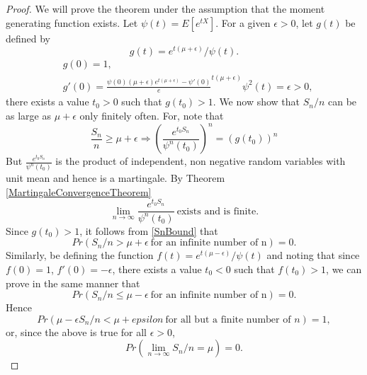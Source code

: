 \documentclass[a4paper,10pt]{article}
\theoremstyle{plain}
\theoremstyle{definition}
\theoremstyle{remark}
\begin{document}
\begin{proof}
We will prove the theorem under the assumption that the moment generating function exists. Let $\psi(t)=E[e^{tX}]$.  For a given $\epsilon>0$, let $g(t)$ be defined by
\begin{equation*}
g(t)=e^{t(\mu+\epsilon)}/\psi(t).
\end{equation*}
\begin{eqnarray*}
&g(0)=1,\\
&g'(0)=\frac{\psi(0)(\mu+\epsilon)e^{t(\mu+\epsilon)}-\psi'(0)}e^{t(\mu+\epsilon)}{\psi^2(t)}=\epsilon >0,
\end{eqnarray*}
there exists a value $t_0>0$ such that $g(t_0)>1$. We now show that $S_n/n$ can be as large as $\mu+\epsilon$ only finitely often. For, note that
\begin{equation}
\label{SnBound}
\frac{S_n}{n} \geq \mu+\epsilon \Rightarrow {(\frac{e^{t_0S_n}}{\psi^n(t_0)})}^n ={(g(t_0))}^n
\end{equation}
But $\frac{e^{t_0S_n}}{\psi^n(t_0)}$ is the product of independent, non negative random variables with unit mean and hence is a martingale. By Theorem \ref{MartingaleConvergenceTheorem}
\begin{equation*}
\lim_{n \rightarrow \infty} \frac{e^{t_0S_n}}{\psi^n(t_0)} ~\text{exists and is finite}.
\end{equation*}
Since $g(t_0) >1$, it follows from \ref{SnBound} that
\begin{equation*}
Pr(S_n/n > \mu+\epsilon ~\text{for an infinite number of n} )=0.
\end{equation*}
Similarly, be defining the function $f(t)=e^{t(\mu-\epsilon)}/\psi(t)$ and noting that since $f(0)=1$, $f'(0)=-\epsilon$, there exists a value $t_0<0$ such that $f(t_0)>1$, we can prove in the same manner that
\begin{equation*}
Pr(S_n/n \leq \mu-\epsilon ~\text{for an infinite number of n} )=0.
\end{equation*}
Hence
\begin{equation*}
Pr(\mu-\epsilon S_n/n < \mu+epsilon ~\text{for all but a finite number of $n$} )=1,
\end{equation*}
or, since the above is true for all $\epsilon>0$,
\begin{equation*}
Pr(\lim_{n \rightarrow \infty}S_n/n=\mu)=0.
\end{equation*}
\end{proof}
\end{document}
